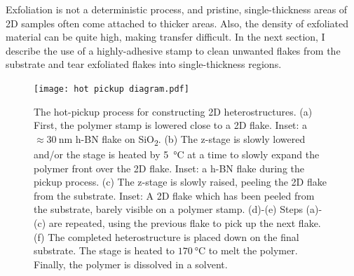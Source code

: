 \documentclass[double,12pt,1in]{beavtex}
\begin{document}
Exfoliation is not a deterministic process, and pristine, single-thickness areas of 2D samples often come attached to thicker areas. Also, the density of exfoliated material can be quite high, making transfer difficult. In the next section, I describe the use of a highly-adhesive stamp to clean unwanted flakes from the substrate and tear exfoliated flakes into single-thickness regions.




\begin{center}

    \linespread{1.0}\selectfont

\end{center}



\begin{figure}
    \texttt{[image: hot pickup diagram.pdf]}
    \caption{The hot-pickup process for constructing 2D heterostructures. (a) First, the polymer stamp is lowered close to a 2D flake. Inset: a $\approx \SI{30}{\nano\meter}$ h-BN flake on SiO\textsubscript{2}. (b) The z-stage is slowly lowered and/or the stage is heated by \SI{5}{\celsius} at a time to slowly expand the polymer front over the 2D flake. Inset: a h-BN flake during the pickup process. (c) The z-stage is slowly raised, peeling the 2D flake from the substrate. Inset: A 2D flake which has been peeled from the substrate, barely visible on a polymer stamp. (d)-(e) Steps (a)-(c) are repeated, using the previous flake to pick up the next flake. (f) The completed heterostructure is placed down on the final substrate. The stage is heated to $\SI{170}{\celsius}$ to melt the polymer. Finally, the polymer is dissolved in a solvent.}
    \label{hot pickup diagram}
\end{figure}
\end{document}
